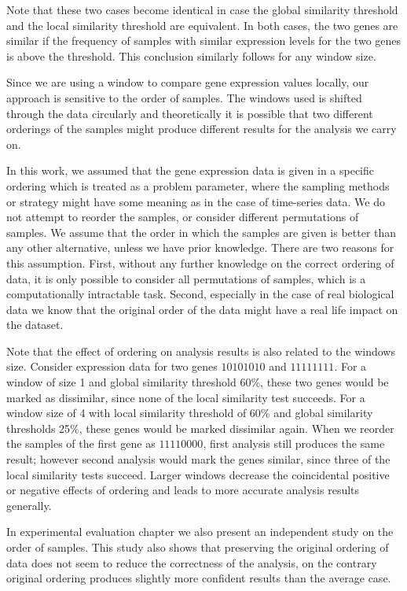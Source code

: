 Note that these two cases become identical in case the global similarity threshold and the local similarity
threshold are equivalent. In both cases, the two genes are similar if the frequency of samples with similar
expression levels for the two genes is above the threshold. This conclusion similarly follows for any window
size.

Since we are using a window to compare gene expression values locally, our approach is sensitive to the order of samples. The windows used is shifted through the data circularly and theoretically it is possible that two different orderings of the samples might produce different results for the analysis we carry on.

In this work, we assumed that the gene expression data is given in a specific ordering which  is treated as a problem parameter, where the sampling methods or strategy might have some meaning as in the case of time-series data. We do not attempt to reorder the samples, or consider different permutations of samples. We assume that the order in which the samples are given is better than any other alternative, unless we have prior knowledge. There are two reasons for this assumption. First, without any further knowledge on the correct ordering of data, it is only possible to consider all permutations of samples, which is a computationally intractable task. Second, especially in the case of real biological data we know that the original order of the data might have a real life impact on the dataset.

Note that the effect of ordering on analysis results is also related to the windows size. Consider expression data for two genes $10101010$ and $11111111$. For a window of size 1 and global similarity threshold 60\%, these two genes would be marked as dissimilar, since none of the local similarity test succeeds. For a window size of 4 with local similarity threshold of 60\% and global similarity thresholds 25\%, these genes would be marked dissimilar again. When we reorder the samples of the first gene as $11110000$, first analysis still produces the same result; however second analysis would mark the genes similar, since three of the local similarity tests succeed. Larger  windows decrease the coincidental positive or negative effects of ordering and leads to more accurate analysis results generally.

In experimental evaluation chapter we also present an independent study on the order of samples. This study also shows that preserving the original ordering of data does not seem to reduce the correctness of the analysis, on the contrary original ordering produces slightly more confident results than the average case.

